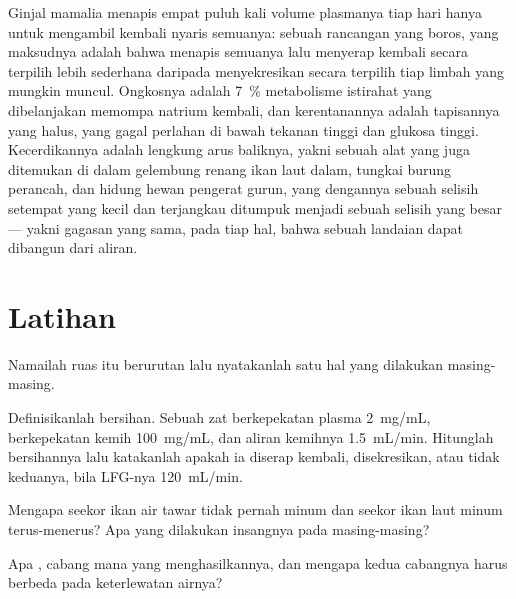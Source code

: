 \begin{remark}\label{rem:b3:renal-osmoregulation:design}
Ginjal mamalia menapis empat puluh kali volume plasmanya tiap hari hanya
untuk mengambil kembali nyaris semuanya: sebuah rancangan yang boros, yang maksudnya adalah
bahwa menapis semuanya lalu menyerap kembali secara terpilih lebih sederhana daripada
menyekresikan secara terpilih tiap limbah yang mungkin muncul. Ongkosnya adalah
\qty{7}{\%} metabolisme istirahat yang dibelanjakan memompa natrium kembali, dan
kerentanannya adalah tapisannya yang halus, yang gagal perlahan di bawah
tekanan tinggi dan glukosa tinggi. Kecerdikannya adalah lengkung arus
baliknya, yakni sebuah alat yang juga ditemukan di dalam gelembung renang ikan laut dalam, tungkai
burung perancah, dan hidung hewan pengerat gurun, yang dengannya sebuah selisih setempat
yang kecil dan terjangkau ditumpuk menjadi sebuah selisih yang besar --- yakni gagasan
yang sama, pada tiap hal, bahwa sebuah landaian dapat dibangun dari aliran.
\end{remark}

\section{Latihan}

\begin{exercise}[$\star$]\label{exo:b3:renal-osmoregulation:1}
Namailah ruas  itu berurutan lalu nyatakanlah satu hal yang dilakukan
masing-masing.
\end{exercise}

\begin{exercise}[$\star$]\label{exo:b3:renal-osmoregulation:2}
Definisikanlah bersihan. Sebuah zat berkepekatan plasma
\qty{2}{mg/mL}, berkepekatan kemih \qty{100}{mg/mL}, dan aliran kemihnya
\qty{1.5}{mL/min}. Hitunglah bersihannya lalu katakanlah apakah ia
diserap kembali, disekresikan, atau tidak keduanya, bila LFG-nya \qty{120}{mL/min}.
\end{exercise}

\begin{exercise}[$\star$]\label{exo:b3:renal-osmoregulation:3}
Mengapa seekor ikan air tawar tidak pernah minum dan seekor ikan laut minum
terus-menerus? Apa yang dilakukan insangnya pada masing-masing?
\end{exercise}

\begin{exercise}[$\star$]\label{exo:b3:renal-osmoregulation:4}
Apa  , cabang mana yang menghasilkannya,
dan mengapa kedua cabangnya harus berbeda pada keterlewatan airnya?
\end{exercise}

